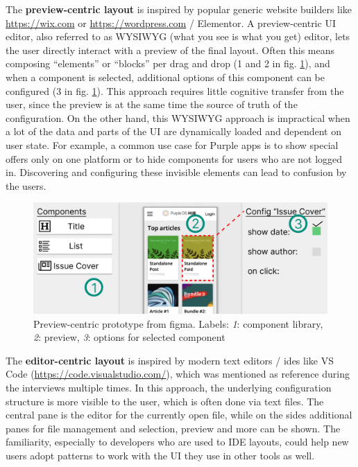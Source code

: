 The \textbf{preview-centric layout} is inspired by popular generic website builders like \url{https://wix.com} or \url{https://wordpress.com} / Elementor.
A preview-centric UI editor, also referred to as WYSIWYG (what you see is what you get) editor, lets the user directly interact with a preview of the final layout.
Often this means composing ``elements'' or ``blocks'' per drag and drop (1 and 2 in fig. \ref{fig:preview-centric}), and when a component is selected, additional options of this component can be configured (3 in fig. \ref{fig:preview-centric}).
This approach requires little cognitive transfer from the user, since the preview is at the same time the source of truth of the configuration.
On the other hand, this WYSIWYG approach is impractical when a lot of the data and parts of the UI are dynamically loaded and dependent on user state.
For example, a common use case for Purple apps is to show special offers only on one platform or to hide components for users who are not logged in.
Discovering and configuring these invisible elements can lead to confusion by the users. 
\begin{figure}[h!]
  \includegraphics[width=\textwidth]{pics/preview_centric.png}
  \caption[Preview-centric prototype]{Preview-centric prototype from figma. Labels: \textit{1}: component library, \textit{2}: preview, \textit{3}: options for selected component}
  \label{fig:preview-centric}
\end{figure}
\newpage
The \textbf{editor-centric layout} is inspired by modern text editors / \Gls{ide}s like VS Code (\url{https://code.visualstudio.com/}), which was mentioned as reference during the interviews multiple times.
In this approach, the underlying configuration structure is more visible to the user, which is often done via text files.
The central pane is the editor for the currently open file, while on the sides additional panes for file management and selection, preview and more can be shown.
The familiarity, especially to developers who are used to IDE layouts, could help new users adopt patterns to work with the UI they use in other tools as well.
